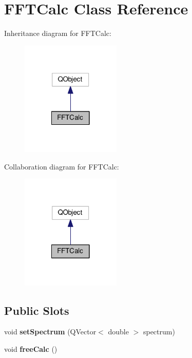 \hypertarget{class_f_f_t_calc}{\section{F\-F\-T\-Calc Class Reference}
\label{class_f_f_t_calc}
}


Inheritance diagram for F\-F\-T\-Calc\-:
\nopagebreak
\begin{figure}[H]
\begin{center}
\leavevmode
\includegraphics[width=134pt]{class_f_f_t_calc__inherit__graph}
\end{center}
\end{figure}


Collaboration diagram for F\-F\-T\-Calc\-:
\nopagebreak
\begin{figure}[H]
\begin{center}
\leavevmode
\includegraphics[width=134pt]{class_f_f_t_calc__coll__graph}
\end{center}
\end{figure}
\subsection*{Public Slots}
\begin{DoxyCompactItemize}
\item 
\hypertarget{class_f_f_t_calc_a630f0941389aa764c341c15a50d6c51a}{void {\bfseries set\-Spectrum} (Q\-Vector$<$ double $>$ spectrum)}\label{class_f_f_t_calc_a630f0941389aa764c341c15a50d6c51a}

\item 
\hypertarget{class_f_f_t_calc_ae12ef5c098a2bb3070a743927ef50da7}{void {\bfseries free\-Calc} ()}\label{class_f_f_t_calc_ae12ef5c098a2bb3070a743927ef50da7}

\end{DoxyCompactItemize}
